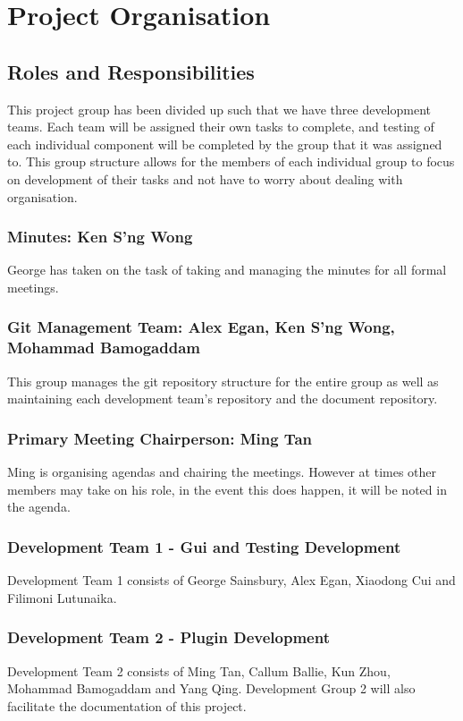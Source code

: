 \documentclass{article}
\begin{document}
\section{Project Organisation}

\subsection{Roles and Responsibilities}
\label{roles-and-responsibilities}
This project group has been divided up such that we have three development teams. Each team will be assigned their own tasks to complete, and testing of each individual component will be completed by the group that it was assigned to. This group structure allows for the members of each individual group to focus on development of their tasks and not have to worry about dealing with organisation.

\subsubsection*{Minutes: Ken S'ng Wong}
George has taken on the task of taking and managing the minutes for all formal meetings.

\subsubsection*{Git Management Team: Alex Egan, Ken S'ng Wong, Mohammad Bamogaddam}
This group manages the git repository structure for the entire group as well as maintaining each development team's repository and the document repository.

\subsubsection*{Primary Meeting Chairperson: Ming Tan}
Ming is organising agendas and chairing the meetings. However at times other members may take on his role, in the event this does happen, it will be noted in the agenda.

\subsubsection*{Development Team 1 - Gui and Testing Development}
Development Team 1 consists of George Sainsbury, Alex Egan, Xiaodong Cui and Filimoni Lutunaika.

\subsubsection*{Development Team 2 - Plugin Development}
Development Team 2 consists of Ming Tan, Callum Ballie, Kun Zhou, Mohammad Bamogaddam and Yang Qing. Development Group 2 will also facilitate the documentation of this project.
\end{document}
